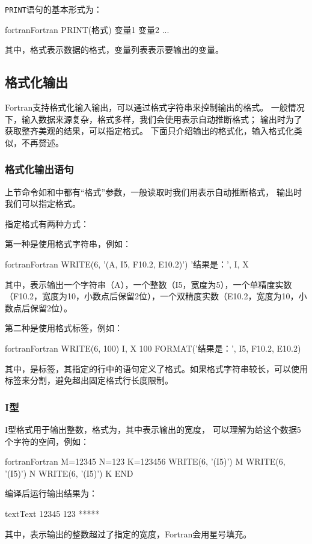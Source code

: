 \texttt{PRINT}语句的基本形式为：
\begin{envcode}{fortran}{Fortran}
      PRINT(格式) 变量1 变量2 ...
\end{envcode}
    其中，格式表示数据的格式，变量列表表示要输出的变量。








\subsection{格式化输出}

Fortran支持格式化输入输出，可以通过格式字符串来控制输出的格式。
一般情况下，输入数据来源复杂，格式多样，我们会使用\code{*}表示自动推断格式；
输出时为了获取整齐美观的结果，可以指定格式。
下面只介绍输出的格式化，输入格式化类似，不再赘述。

\subsubsection{格式化输出语句}

上节命令如和中都有“格式”参数，一般读取时我们用\code{*}表示自动推断格式，
输出时我们可以指定格式。

指定格式有两种方式：

第一种是使用格式字符串，例如：
\begin{envcode}{fortran}{Fortran}
      WRITE(6, '(A, I5, F10.2, E10.2)') '结果是：', I, X
\end{envcode}
其中，表示输出一个字符串（A），一个整数（I5，宽度为5），一个单精度实数（F10.2，宽度为10，小数点后保留2位），一个双精度实数（E10.2，宽度为10，小数点后保留2位）。

第二种是使用格式标签，例如：
\begin{envcode}{fortran}{Fortran}
      WRITE(6, 100) I, X
  100 FORMAT('结果是：', I5, F10.2, E10.2)
\end{envcode}
其中，是标签，其指定的行中的语句定义了格式。如果格式字符串较长，可以使用标签来分割，避免超出固定格式行长度限制。

\subsubsection{I型}
I型格式用于输出整数，格式为，其中表示输出的宽度，
可以理解为给这个数据5个字符的空间，例如：
\begin{envcode}{fortran}{Fortran}
      M=12345
      N=123
      K=123456
      WRITE(6, '(I5)') M
      WRITE(6, '(I5)') N
      WRITE(6, '(I5)') K
      END
\end{envcode}
编译后运行输出结果为：
\begin{envcode}{text}{Text}
12345
  123
*****
\end{envcode}
其中，\code{*****}表示输出的整数超过了指定的宽度，Fortran会用星号填充。

